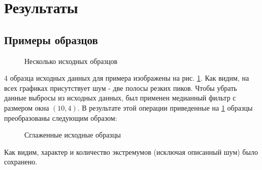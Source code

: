 \documentclass[a4paper]{article}
\begin{document}
\section{Результаты}
\subsection{Примеры образцов}
\begin{figure}[H]
    \centering
    
    
    
    
    \caption{Несколько исходных образцов}
    \label{fig:samples}
\end{figure}
4 образца исходных данных для примера изображены на рис. \ref{fig:samples}. Как видим, на всех графиках присутствует шум - две полосы резких пиков. Чтобы убрать данные выбросы из исходных данных, был применен медианный фильтр с размером окна $(10, 4)$. В результате этой операции приведенные на \ref{fig:samples} образцы преобразованы следующим образом:
\begin{figure}[H]
    \centering
    
    
    
    
    \caption{Сглаженные исходные образцы}
    \label{fig:samples_filtered}
\end{figure}
Как видим, характер и количество экстремумов (исключая описанный шум) было сохранено.
\end{document}
